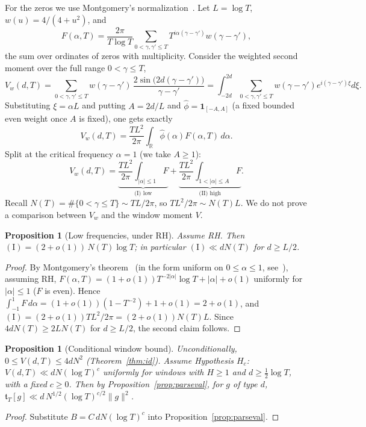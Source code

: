 \documentclass[11pt]{amsart}
\newtheorem{proposition}[theorem]{Proposition}
\theoremstyle{definition}
\theoremstyle{remark}
\newcommand{\ft}{\mathfrak t}
\newcommand{\bbR}{\mathbb{R}}
\begin{document}
For the zeros we use Montgomery's normalization~\cite{Mont}. Let $L=\log T$,
$w(u)=4/(4+u^2)$, and
\[
F(\alpha,T)=\frac{2\pi}{T\log T}\sum_{0<\gamma,\gamma'\le T}T^{i\alpha(\gamma-\gamma')}w(\gamma-\gamma'),
\]
the sum over ordinates of zeros with multiplicity. Consider the weighted second
moment over the full range $0<\gamma\le T$,
\[
V_w(d,T)=\sum_{0<\gamma,\gamma'\le T}w(\gamma-\gamma')\,\frac{2\sin\!\bigl(2d(\gamma-\gamma')\bigr)}{\gamma-\gamma'}
=\int_{-2d}^{2d}\sum_{0<\gamma,\gamma'\le T}w(\gamma-\gamma')e^{i(\gamma-\gamma')\xi}d\xi .
\]
Substituting $\xi=\alpha L$ and putting $A=2d/L$ and
$\widehat\phi=\mathbf 1_{[-A,A]}$ (a fixed bounded even weight once $A$ is
fixed), one gets exactly
\[
V_w(d,T)=\frac{TL^2}{2\pi}\int_{\bbR}\widehat\phi(\alpha)F(\alpha,T)\,d\alpha .
\]
Split at the critical frequency $\alpha=1$ (we take $A\ge1$):
\[
V_w(d,T)=\underbrace{\frac{TL^2}{2\pi}\int_{|\alpha|\le1}F}_{\text{(I) low}}
+\underbrace{\frac{TL^2}{2\pi}\int_{1<|\alpha|\le A}F}_{\text{(II) high}} .
\]
Recall $N(T)=\#\{0<\gamma\le T\}\sim TL/2\pi$, so $TL^2/2\pi\sim N(T)L$. We do
not prove a comparison between $V_w$ and the window moment $V$.

\begin{proposition}[Low frequencies, under RH]\label{prop:low}
Assume RH. Then $\mathrm{(I)}=(2+o(1))\,N(T)\log T$; in particular
$\mathrm{(I)}\ll dN(T)$ for $d\ge L/2$.
\end{proposition}
\begin{proof}
By Montgomery's theorem~\cite{Mont} (in the form uniform on $0\le\alpha\le1$,
see~\cite{GM}), assuming RH, $F(\alpha,T)=(1+o(1))T^{-2|\alpha|}\log T+|\alpha|+o(1)$
uniformly for $|\alpha|\le1$ ($F$ is even). Hence
$\int_{-1}^{1}F\,d\alpha=(1+o(1))(1-T^{-2})+1+o(1)=2+o(1)$, and
$\mathrm{(I)}=(2+o(1))TL^2/2\pi=(2+o(1))N(T)L$. Since $4dN(T)\ge2LN(T)$ for
$d\ge L/2$, the second claim follows.
\end{proof}

\begin{proposition}[Conditional window bound]\label{prop:S}
Unconditionally, $0\le V(d,T)\le4dN^2$ (Theorem~\ref{thm:id}). Assume
\emph{Hypothesis $H_c$}: $V(d,T)\ll dN(\log T)^c$ uniformly for windows with
$H\ge1$ and $d\ge\tfrac12\log T$, with a fixed $c\ge0$. Then by
Proposition~\ref{prop:parseval}, for $g$ of type $d$,
$\ft_T[g]\ll d\,N^{1/2}(\log T)^{c/2}\|g\|^2$.
\end{proposition}
\begin{proof}
Substitute $B=C\,dN(\log T)^c$ into Proposition~\ref{prop:parseval}.
\end{proof}
\end{document}
